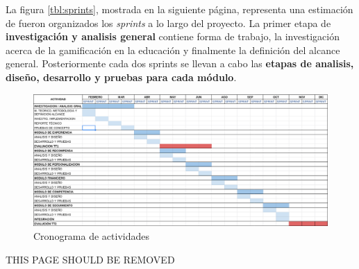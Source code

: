  \noindent 
 La figura \ref{tbl:sprints}, mostrada en la siguiente página, representa una estimación de fueron
 organizados los {\it sprints} a lo largo del proyecto. La primer etapa de {\bf investigación
 y analisis general} contiene forma de trabajo, la investigación acerca de la gamificación en la educación
 y finalmente la definición del alcance general. Posteriormente cada dos sprints se llevan a cabo las {\bf
 etapas de analisis, diseño, desarrollo y pruebas para cada módulo}. \clearpage

    \begin{figure}
        \centering
        \includegraphics[width=1\textwidth]{analisis/diagrams/cronograma}
        \caption{Cronograma de actividades}
        \label{fig:awesome_image}
    \end{figure}

 \clearpage

    {\centering\color{primary}\Huge THIS PAGE SHOULD BE REMOVED}

